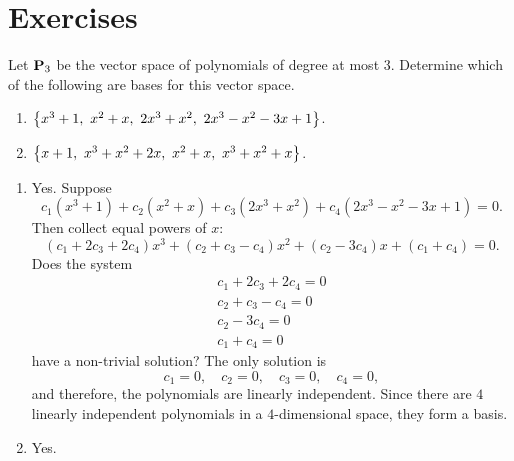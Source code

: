 \section*{Exercises}

\begin{ex}
  Let $\mathbf{P}_3$ be the vector space of polynomials of degree at most
  3. Determine which of the following are bases for this vector space.

  \begin{enumerate}
  \item $\left\{x^{3}+1,~x^{2}+x,~2x^{3}+x^{2},~2x^{3}-x^{2}-3x+1\right\}$.
  \item $\left\{x+1,~x^{3}+x^{2}+2x,~x^{2}+x,~x^{3}+x^{2}+x\right\}$.
  \end{enumerate}

  \begin{sol}
    \begin{enumerate}
    \item
      Yes. Suppose
      \begin{equation*}
        c_{1}(x^{3}+1) +c_{2}(x^{2}+x) +c_{3}(
        2x^{3}+x^{2}) +c_{4}(2x^{3}-x^{2}-3x+1) =0.
      \end{equation*}
      Then collect equal powers of $x$:
      \begin{equation*}
        (c_{1}+2c_{3}+2c_{4}) x^{3}+(c_{2}+c_{3}-c_{4})
        x^{2}+(c_{2}-3c_{4}) x+(c_{1}+c_{4}) =0.
      \end{equation*}
      Does the system
      \begin{equation*}
        \begin{array}{c}
          c_{1}+2c_{3}+2c_{4}=0 \\
          c_{2}+c_{3}-c_{4}=0 \\
          c_{2}-3c_{4}=0 \\
          c_{1}+c_{4}=0
        \end{array}
      \end{equation*}
      have a non-trivial solution? The only solution is
      \begin{equation*}
        c_{1}=0,\quad
        c_{2}=0,\quad
        c_{3}=0,\quad
        c_{4}=0,
      \end{equation*}
      and therefore, the polynomials are linearly independent. Since
      there are $4$ linearly independent polynomials in a
      $4$-dimensional space, they form a basis.
    \item Yes.
    \end{enumerate}
  \end{sol}
\end{ex}

